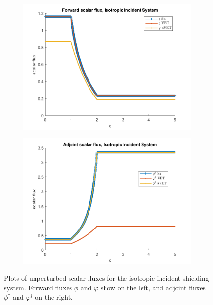 \documentclass[12pt]{report}
\begin{document}
\begin{figure}[H]
\centering
\begin{subfigure}{.5\textwidth}
  \centering
  \includegraphics[width=.98\linewidth]{figures2/24phi.png}
\end{subfigure}%
\begin{subfigure}{.5\textwidth}
  \centering
  \includegraphics[width=.98\linewidth]{figures2/24phia.png}
\end{subfigure}
\caption{Plots of unperturbed scalar fluxes for the isotropic incident shielding system. Forward fluxes $\phi$ and $\varphi$ show on the left, and adjoint fluxes $\phi^\dag$ and $\varphi^\dag$ on the right.}
\label{Flux3}
\end{figure}
\end{document}
